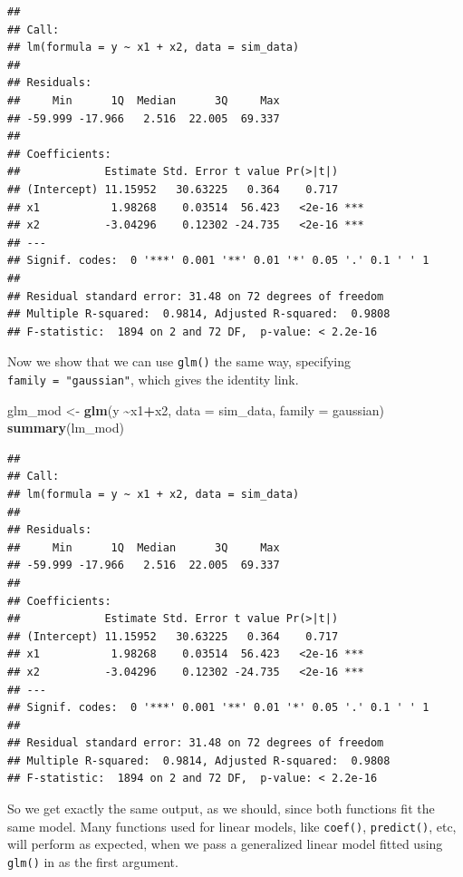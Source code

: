 \documentclass[
]{book}
\newenvironment{Shaded}{\begin{snugshade}}{\end{snugshade}}
\newcommand{\DataTypeTok}[1]{\textcolor[rgb]{0.13,0.29,0.53}{#1}}
\newcommand{\KeywordTok}[1]{\textcolor[rgb]{0.13,0.29,0.53}{\textbf{#1}}}
\newcommand{\NormalTok}[1]{#1}
\newcommand{\OperatorTok}[1]{\textcolor[rgb]{0.81,0.36,0.00}{\textbf{#1}}}
\newcommand{\StringTok}[1]{\textcolor[rgb]{0.31,0.60,0.02}{#1}}
\begin{document}
\begin{verbatim}
## 
## Call:
## lm(formula = y ~ x1 + x2, data = sim_data)
## 
## Residuals:
##     Min      1Q  Median      3Q     Max 
## -59.999 -17.966   2.516  22.005  69.337 
## 
## Coefficients:
##             Estimate Std. Error t value Pr(>|t|)    
## (Intercept) 11.15952   30.63225   0.364    0.717    
## x1           1.98268    0.03514  56.423   <2e-16 ***
## x2          -3.04296    0.12302 -24.735   <2e-16 ***
## ---
## Signif. codes:  0 '***' 0.001 '**' 0.01 '*' 0.05 '.' 0.1 ' ' 1
## 
## Residual standard error: 31.48 on 72 degrees of freedom
## Multiple R-squared:  0.9814, Adjusted R-squared:  0.9808 
## F-statistic:  1894 on 2 and 72 DF,  p-value: < 2.2e-16
\end{verbatim}

Now we show that we can use \texttt{glm()} the same way, specifying \texttt{family\ =\ "gaussian"}, which gives the identity link.

\begin{Shaded}
\begin{Highlighting}[]
\NormalTok{glm\_mod \textless{}{-}}\StringTok{ }\KeywordTok{glm}\NormalTok{(y }\OperatorTok{\textasciitilde{}}\NormalTok{x1}\OperatorTok{+}\NormalTok{x2, }\DataTypeTok{data =}\NormalTok{ sim\_data, }\DataTypeTok{family =}\NormalTok{ gaussian)}
\KeywordTok{summary}\NormalTok{(lm\_mod)}
\end{Highlighting}
\end{Shaded}

\begin{verbatim}
## 
## Call:
## lm(formula = y ~ x1 + x2, data = sim_data)
## 
## Residuals:
##     Min      1Q  Median      3Q     Max 
## -59.999 -17.966   2.516  22.005  69.337 
## 
## Coefficients:
##             Estimate Std. Error t value Pr(>|t|)    
## (Intercept) 11.15952   30.63225   0.364    0.717    
## x1           1.98268    0.03514  56.423   <2e-16 ***
## x2          -3.04296    0.12302 -24.735   <2e-16 ***
## ---
## Signif. codes:  0 '***' 0.001 '**' 0.01 '*' 0.05 '.' 0.1 ' ' 1
## 
## Residual standard error: 31.48 on 72 degrees of freedom
## Multiple R-squared:  0.9814, Adjusted R-squared:  0.9808 
## F-statistic:  1894 on 2 and 72 DF,  p-value: < 2.2e-16
\end{verbatim}

So we get exactly the same output, as we should, since both functions fit the same model. Many functions used for linear models, like \texttt{coef()}, \texttt{predict()}, etc, will perform as expected, when we pass a generalized linear model fitted using \texttt{glm()} in as the first argument.
\end{document}
